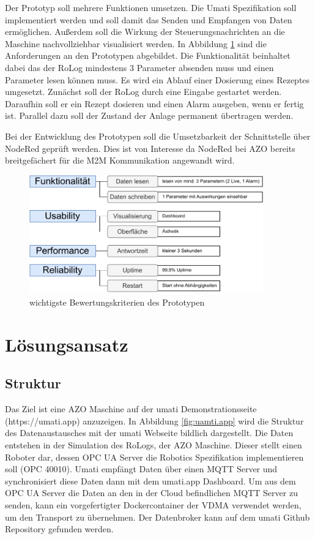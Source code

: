 \documentclass[a4paper, 12pt, oneside]{scrbook}
\begin{document}
		Der Prototyp soll mehrere Funktionen umsetzen. Die Umati Spezifikation soll implementiert werden und soll damit das Senden und Empfangen von Daten ermöglichen. Außerdem soll die Wirkung der Steuerungsnachrichten an die Maschine nachvollziehbar visualisiert werden. In Abbildung \ref{fig:evaluation} sind die Anforderungen an den Prototypen abgebildet. Die Funktionalität beinhaltet dabei das der RoLog mindestens 3 Parameter absenden muss und einen Parameter lesen können muss. Es wird ein Ablauf einer Dosierung eines Rezeptes umgesetzt. Zunächst soll der RoLog durch eine Eingabe gestartet werden. Daraufhin soll er ein Rezept dosieren und einen Alarm ausgeben, wenn er fertig ist. Parallel dazu soll der Zustand der Anlage permanent übertragen werden. %
		
		Bei der Entwicklung des Prototypen soll die Umsetzbarkeit der Schnittstelle über NodeRed geprüft werden. Dies ist von Interesse da NodeRed bei AZO bereits breitgefächert für die M2M Kommunikation angewandt wird. %
		
		\begin{figure}[H]
			\centering
			\includegraphics[width=0.9\textwidth]{res/analysen/Evaluation.pdf}
			\caption{wichtigste Bewertungskriterien des Prototypen}
			\label{fig:evaluation}
		\end{figure}
		
	
	\section{Lösungsansatz}
	
		\subsection{Struktur}
		
		
		
		Das Ziel ist eine AZO Maschine auf der umati Demonstrationsseite (https://umati.app) anzuzeigen. In Abbildung \ref{fig:uamti.app} wird die Struktur des Datenaustausches mit der umati Webseite bildlich dargestellt. Die Daten entstehen in der Simulation des RoLogs, der AZO Maschine. Dieser stellt einen Roboter dar, dessen OPC UA Server die Robotics Spezifikation implementieren soll (OPC 40010). Umati empfängt Daten über einen MQTT Server und synchronisiert diese Daten dann mit dem umati.app Dashboard. Um aus dem OPC UA Server die Daten an den in der Cloud befindlichen MQTT Server zu senden, kann ein vorgefertigter Dockercontainer der VDMA verwendet werden, um den Transport zu übernehmen. Der Datenbroker kann auf dem umati Github Repository gefunden werden.
		
\end{document}
